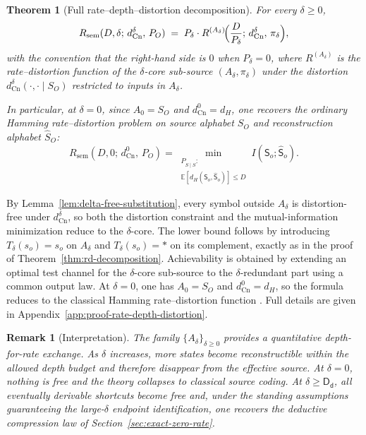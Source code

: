 \documentclass[journal,onecolumn]{IEEEtran}
\makeatletter
\newcommand{\Cn}{\text{Cn}}
\newcommand{\E}{\mathbb{E}}
\newtheorem{theorem}{Theorem}[section]
\newtheorem{remark}{Remark}[section]
\numberwithin{equation}{section}
\renewenvironment{proof}[1][\proofname]{\par
  \pushQED{\qed}%
  \normalfont \topsep6\p@\@plus6\p@\relax
  \trivlist
  \item[\hskip\labelsep
        \itshape
    #1\@addpunct{.}]\ignorespaces
}{%
  \popQED\endtrivlist\@endpefalse
}
\makeatother
\begin{document}
\begin{theorem}[Full rate--depth--distortion decomposition]
\label{thm:rate-depth-distortion}
For every \(\delta\ge 0\),
\begin{equation}\label{eq:rdd-surface}
  R_{\mathrm{sem}}(D,\delta;\,d_{\Cn}^{\delta},\,P_O)
  \;=\;
  P_\delta\cdot
  R^{(A_\delta)}\!\Bigl(\frac{D}{P_\delta};\,
  d_{\Cn}^{\delta},\,\pi_\delta\Bigr),
\end{equation}
with the convention that the right-hand side is \(0\) when
\(P_\delta=0\), where \(R^{(A_\delta)}\) is the
rate--distortion function of the \(\delta\)-core sub-source
\((A_\delta,\pi_\delta)\) under the distortion
\(d_{\Cn}^{\delta}(\cdot,\cdot\mid S_O)\) restricted to inputs in
\(A_\delta\).

In particular, at \(\delta=0\), since \(A_0=S_O\) and
\(d_{\Cn}^{0}=d_H\), one recovers the ordinary Hamming
rate--distortion problem on source alphabet \(S_O\) and
reconstruction alphabet \(\hat S_O\):
\[
  R_{\mathrm{sem}}(D,0;\,d_{\Cn}^{0},\,P_O)
  =
  \min_{\substack{P_{\hat S\mid S}:\\
  \E[d_H({\mathsf{S}}_o,\hat {\mathsf{S}}_o)]\le D}}
  I(\mathsf{S}_o;\hat{\mathsf{S}}_o).
\]
\end{theorem}

\begin{proof}[Proof sketch]
By Lemma~\ref{lem:delta-free-substitution}, every symbol outside
\(A_\delta\) is distortion-free under \(d_{\Cn}^{\delta}\), so both
the distortion constraint and the mutual-information minimization
reduce to the \(\delta\)-core.
The lower bound follows by introducing
\(T_\delta(s_o)=s_o\) on \(A_\delta\) and \(T_\delta(s_o)=*\) on its
complement, exactly as in the proof of
Theorem~\ref{thm:rd-decomposition}.
Achievability is obtained by extending an optimal test channel for the
\(\delta\)-core sub-source to the \(\delta\)-redundant part using a
common output law.
At \(\delta=0\), one has \(A_0=S_O\) and \(d_{\Cn}^{0}=d_H\), so the
formula reduces to the classical Hamming rate--distortion function
\cite{shannon1959coding,cover2006elements,csiszar2011information}.
Full details are given in
Appendix~\ref{app:proof-rate-depth-distortion}.
\end{proof}

\begin{remark}[Interpretation]
\label{rem:depth-interpretation}
The family \(\{A_\delta\}_{\delta\ge 0}\) provides a quantitative
depth-for-rate exchange.
As \(\delta\) increases, more states become reconstructible within
the allowed depth budget and therefore disappear from the
effective source.
At \(\delta=0\), nothing is free and the theory collapses to
classical source coding.
At \(\delta\ge \mathsf{D_d}\), all eventually derivable shortcuts
become free and, under the standing assumptions guaranteeing the
large-\(\delta\) endpoint identification, one recovers the deductive
compression law of Section~\ref{sec:exact-zero-rate}.
\end{remark}
\end{document}
